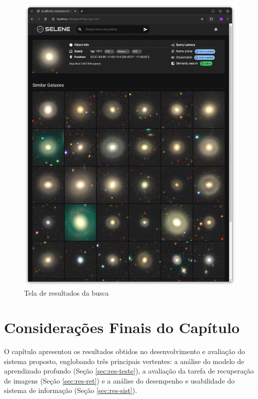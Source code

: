 \begin{figure}[!ht]
  \centering
  \caption{Tela de resultados da busca}
  \label{fig:tela-resultados}
  \includegraphics[width=\linewidth]{figures/screen-3.png}
\end{figure}

\afterpage{\clearpage}



\section{Considerações Finais do Capítulo}
O capítulo apresentou os resultados obtidos no desenvolvimento e avaliação do sistema proposto, englobando três principais vertentes: a análise do modelo de aprendizado profundo (Seção \ref{sec:res-teste}), a avaliação da tarefa de recuperação de imagens (Seção \ref{sec:res-ret}) e a análise do desempenho e usabilidade do sistema de informação (Seção \ref{sec:res-sist}).

